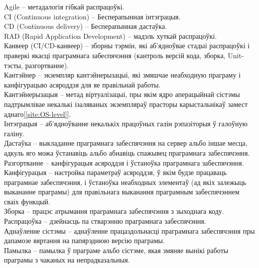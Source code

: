 \thispagestyle{empty}
\noindent%
Agile -- метадалогія гібкай распрацоўкі.
\\
CI (Continuous integration) -- Бесперапынная інтэграцыя.
\\
CD (Continuous delivery) -- Бесперапынная дастаўка.
\\
RAD (Rapid Application Development) -- мадэль хуткай распрацоўкі.
\\
Канвеер (CI/CD-канвеер) -- зборны тэрмін, які аб'ядноўвае
стадыі распрацоўкі і праверкі якасці праграмнага забеспячэння
(кантроль версій кода, зборка, Unit-тэсты, разгортванне).
\\
Кантэйнер -- экземпляр кантэйнерызацыі, які змяшчае
неабходную праграму і канфігурацыю асяроддзя для яе правільнай
работы.
\\
Кантэйнерызацыя -- метад віртуалізацыі, пры якім ядро
аперацыйнай сістэмы падтрымлівае некалькі ізаляваных
экземпляраў прасторы карыстальнікаў замест аднаго[\ref{site:OS-level}].
\\
Інтэграцыя -- аб'ядноўванне некалькіх працоўных галін рэпазіторыя ў
галоўную галіну.
\\
Дастаўка -- выкладанне праграмнага забеспячэння на сервер
альбо іншае месца, адкуль яго можа ўстанавіць альбо абнавіць спажывец
праграмнага забеспячэння.
\\
Разгортванне -- канфігурацыя асяроддзя і ўстаноўка праграмнага
забеспячэння.
\\
Канфігурацыя -- настройка параметраў асяроддзя, ў якім будзе
працаваць праграмнае забеспячэння, і ўстаноўка неабходных элементаў
(ад якіх залежыць выкананне праграмы) для правільнага выканання
праграмным забеспячэннем сваіх функцый.
\\
Зборка -- працэс атрымання праграмнага забеспячэння з зыходнага коду.
\\
Распрацоўка -- дзейнасць па стварэнню праграмнага забеспячэння.
\\
Аднаўленне сістэмы -- аднаўленне працаздольнасці праграмнага
забеспячэння пры дапамозе вяртання на папярэднюю версію праграмы.
\\
Памылка -- памылка ў праграме альбо сістэме, якая змяняе
вынікі работы праграмы з чаканых на непрадказальныя.

\clearpage
